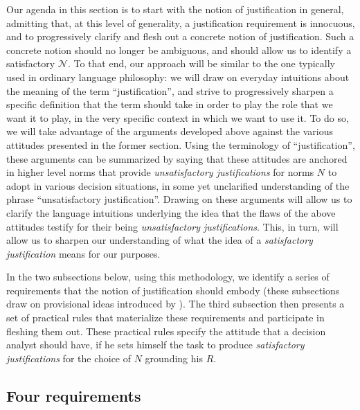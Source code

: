 \documentclass[preprint, french, english, 11pt, authoryear]{elsarticle}%
\newcommand{\adv}{\mathscr{N}}
\begin{document}
Our agenda in this section is to start with the notion of justification in general, admitting that, at this level of generality, a justification requirement is innocuous, and to progressively clarify and flesh out a concrete notion of justification. Such a concrete notion should no longer be ambiguous, and should allow us to identify a satisfactory $\adv$. To that end, our approach will be similar to the one typically used in ordinary language philosophy: we will draw on everyday intuitions about the meaning of the term ``justification'', and strive to progressively sharpen a specific definition that the term should take in order to play the role that we want it to play, in the very specific context in which we want to use it. To do so, we will take advantage of the arguments developed above against the various attitudes presented in the former section. Using the terminology of ``justification'', these arguments can be summarized by saying that these attitudes are anchored in higher level norms that provide \emph{unsatisfactory justifications} for norms $N$ to adopt in various decision situations, in some yet unclarified understanding of the phrase ``unsatisfactory justification''. Drawing on these arguments will allow us to clarify the language intuitions underlying the idea that the flaws of the above attitudes testify for their being \emph{unsatisfactory justifications}. This, in turn, will allow us to sharpen our understanding of what the idea of a \emph{satisfactory justification} means for our purposes.

In the two subsections below, using this methodology, we identify a series of requirements that the notion of justification should embody (these subsections draw on provisional ideas introduced by \citet{meinard_du_2013, meinard_what_2017}). The third subsection then presents a set of practical rules that materialize these requirements and participate in fleshing them out. These practical rules specify the attitude that a decision analyst should have, if he sets himself the task to produce \emph{satisfactory justifications} for the choice of $N$ grounding his $R$.

\subsection{Four requirements}
\end{document}
